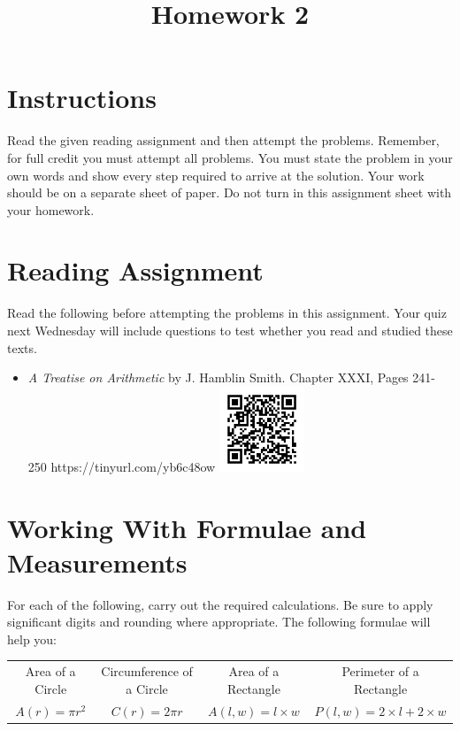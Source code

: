 \documentclass{article}
\title{Homework 2}
\date{}
\begin{document}
\maketitle

\section*{Instructions}
Read the given reading assignment and then attempt the problems.  Remember, for full
credit you must attempt all problems.  You must state the problem in your own words and show every step required to arrive at the solution.  Your work should be on a separate sheet of paper.  Do not turn in this assignment sheet with your homework.

\section*{Reading Assignment}
Read the following before attempting the problems in this assignment.  
Your quiz next Wednesday will include questions to test whether you read and studied
these texts.

\begin{itemize}
\item {\em A Treatise on Arithmetic} by J. Hamblin Smith. Chapter XXXI, Pages 241-250\newline
https://tinyurl.com/yb6c48ow\newline
\includegraphics[width=1in]{readings/treatise1}
\end{itemize}

\section*{Working With Formulae and Measurements}
For each of the following, carry out the required calculations.  Be sure to apply 
significant digits and rounding where appropriate.  The following formulae will help you:
\newline

\begin{tabular}{|c|c|c|c|}
\hline
Area of a Circle & Circumference of a Circle & Area of a Rectangle & Perimeter of a Rectangle\\
$A(r) = \pi r^2$ & $C(r) = 2\pi r$ & $A(l,w)=l \times w$ & $P(l,w) = 2\times l + 2 \times w$\\
\hline
\end{tabular}
\end{document}
